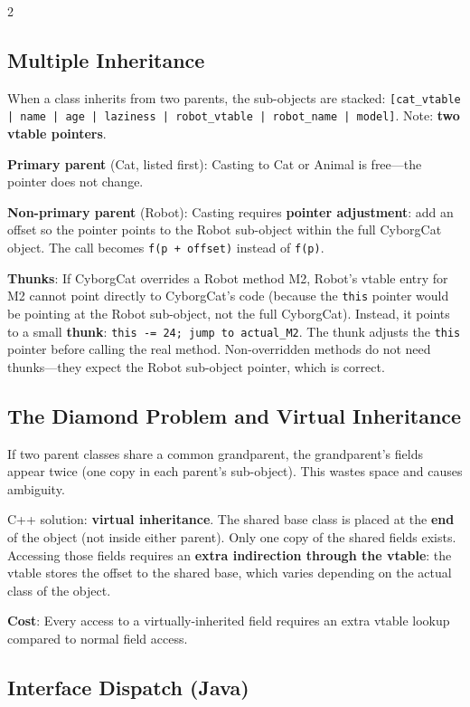 \documentclass[9pt,landscape]{extarticle}
\begin{document}
\begin{multicols}{2}
\subsection{Multiple Inheritance}

When a class inherits from two parents, the sub-objects are stacked: \texttt{[cat\_vtable | name | age | laziness | robot\_vtable | robot\_name | model]}. Note: \textbf{two vtable pointers}.

\textbf{Primary parent} (Cat, listed first): Casting to Cat or Animal is free---the pointer does not change.

\textbf{Non-primary parent} (Robot): Casting requires \textbf{pointer adjustment}: add an offset so the pointer points to the Robot sub-object within the full CyborgCat object. The call becomes \texttt{f(p + offset)} instead of \texttt{f(p)}.

\textbf{Thunks}: If CyborgCat overrides a Robot method M2, Robot's vtable entry for M2 cannot point directly to CyborgCat's code (because the \texttt{this} pointer would be pointing at the Robot sub-object, not the full CyborgCat). Instead, it points to a small \textbf{thunk}: \texttt{this -= 24; jump to actual\_M2}. The thunk adjusts the \texttt{this} pointer before calling the real method. Non-overridden methods do not need thunks---they expect the Robot sub-object pointer, which is correct.

\subsection{The Diamond Problem and Virtual Inheritance}

If two parent classes share a common grandparent, the grandparent's fields appear twice (one copy in each parent's sub-object). This wastes space and causes ambiguity.

C++ solution: \textbf{virtual inheritance}. The shared base class is placed at the \textbf{end} of the object (not inside either parent). Only one copy of the shared fields exists. Accessing those fields requires an \textbf{extra indirection through the vtable}: the vtable stores the offset to the shared base, which varies depending on the actual class of the object.

\textbf{Cost}: Every access to a virtually-inherited field requires an extra vtable lookup compared to normal field access.

\subsection{Interface Dispatch (Java)}


\end{multicols}
\end{document}

